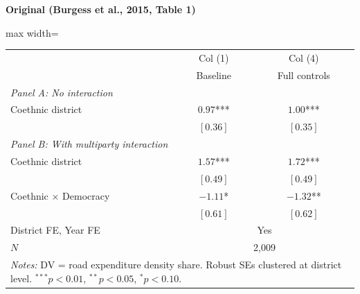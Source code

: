 \documentclass[11pt,a4paper]{article}
\begin{document}
\vspace{0.3cm}
\noindent{}

\vspace{0.5cm}
\begin{minipage}[t]{0.48\textwidth}
\centering
\textbf{\large Original (Burgess et al., 2015, Table 1)}
\vspace{0.3cm}

\begin{adjustbox}{max width=\textwidth}
\begin{tabular}{lcc}
\toprule
 & Col (1) & Col (4) \\
 & Baseline & Full controls \\
\midrule
\multicolumn{3}{l}{\textit{Panel A: No interaction}} \\[3pt]
Coethnic district & $0.97$*** & $1.00$*** \\
 & $[0.36]$ & $[0.35]$ \\[0.3em]
\multicolumn{3}{l}{\textit{Panel B: With multiparty interaction}} \\[3pt]
Coethnic district & $1.57$*** & $1.72$*** \\
 & $[0.49]$ & $[0.49]$ \\
Coethnic $\times$ Democracy & $-1.11$* & $-1.32$** \\
 & $[0.61]$ & $[0.62]$ \\[0.3em]
\midrule
District FE, Year FE & \multicolumn{2}{c}{Yes} \\
$N$ & \multicolumn{2}{c}{2,009} \\
\bottomrule
\multicolumn{3}{p{0.95\textwidth}}{\footnotesize\textit{Notes:} DV = road expenditure density share. Robust SEs clustered at district level. $^{***}p<0.01$, $^{**}p<0.05$, $^{*}p<0.10$.}
\end{tabular}
\end{adjustbox}
\end{minipage}%
\hfill
\end{document}
